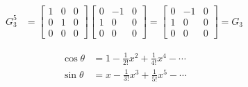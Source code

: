 \documentclass[letterpaper]{article}
\begin{document}
\begin{align*}
	\\
	G_3^{5} &=  
	\begin{bmatrix} 1&0&0\\0&1&0\\0&0&0 \end{bmatrix} 
	\begin{bmatrix} 0&-1&0\\1&0&0\\0&0&0 \end{bmatrix}  = 
	\begin{bmatrix} 0&-1&0\\1&0&0\\0&0&0 \end{bmatrix}  = G_3
\end{align*}

\begin{align*}
	\cos \theta &= 1 - \frac{1}{2!} x^2 + \frac{1}{4!} x^{4} - \cdots  \\ 
	\sin \theta &= x - \frac{1}{3!} x^3 + \frac{1}{5!} x^{5} - \cdots \\
\end{align*}
\end{document}
